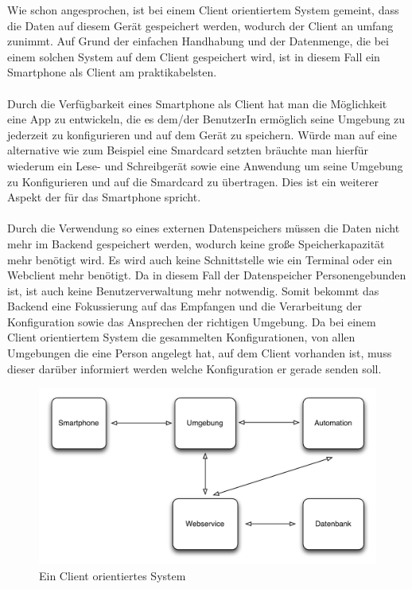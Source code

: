 Wie schon angesprochen, ist bei einem Client orientiertem System gemeint, dass die Daten auf diesem Gerät gespeichert werden, wodurch der Client an umfang zunimmt. Auf Grund der einfachen Handhabung und der Datenmenge, die bei einem solchen System auf dem Client gespeichert wird, ist in diesem Fall ein Smartphone als Client am praktikabelsten.  
\\\\
Durch die Verfügbarkeit eines Smartphone als Client hat man die Möglichkeit eine App zu entwickeln, die es dem/der BenutzerIn ermöglich seine Umgebung zu jederzeit zu konfigurieren und auf dem Gerät zu speichern. Würde man auf eine alternative wie zum Beispiel eine Smardcard setzten bräuchte man hierfür wiederum ein Lese- und Schreibgerät sowie eine Anwendung um seine Umgebung zu Konfigurieren und auf die Smardcard zu übertragen. Dies ist ein weiterer Aspekt der für das Smartphone spricht.
\\\\
Durch die Verwendung so eines externen Datenspeichers müssen die Daten nicht mehr im Backend gespeichert werden, wodurch keine große Speicherkapazität mehr benötigt wird. Es wird auch keine Schnittstelle wie ein Terminal oder ein Webclient mehr benötigt. Da in diesem Fall der Datenspeicher Personengebunden ist, ist auch keine Benutzerverwaltung mehr notwendig. Somit bekommt das Backend eine Fokussierung auf das Empfangen und die Verarbeitung der Konfiguration sowie das Ansprechen der richtigen Umgebung.
Da bei einem Client orientiertem System die gesammelten Konfigurationen, von allen Umgebungen die eine Person angelegt hat, auf dem Client vorhanden ist, muss dieser darüber informiert werden welche Konfiguration er gerade senden soll. 
\begin{figure}[H]
\includegraphics[width=12.5cm]{images/client}
\caption{Ein Client orientiertes System}
\end{figure}
